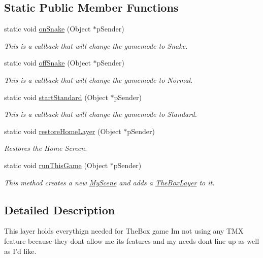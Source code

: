 \subsection*{\-Static \-Public \-Member \-Functions}
\begin{DoxyCompactItemize}
\item 
static void \hyperlink{class_the_box_layer_a91e48a9efb07ed70fac3e1880934cf37}{on\-Snake} (\-Object $\ast$p\-Sender)
\begin{DoxyCompactList}\small\item\em \-This is a callback that will change the gamemode to \-Snake. \end{DoxyCompactList}\item 
static void \hyperlink{class_the_box_layer_ae03788f405b053b85e230804d7a88904}{off\-Snake} (\-Object $\ast$p\-Sender)
\begin{DoxyCompactList}\small\item\em \-This is a callback that will change the gamemode to \-Normal. \end{DoxyCompactList}\item 
static void \hyperlink{class_the_box_layer_a3e32611fa82942d00d5e561bc59251e9}{start\-Standard} (\-Object $\ast$p\-Sender)
\begin{DoxyCompactList}\small\item\em \-This is a callback that will change the gamemode to \-Standard. \end{DoxyCompactList}\item 
static void \hyperlink{class_the_box_layer_af670f77242c15a7de84d6658cddb7056}{restore\-Home\-Layer} (\-Object $\ast$p\-Sender)
\begin{DoxyCompactList}\small\item\em \-Restores the \-Home \-Screen. \end{DoxyCompactList}\item 
static void \hyperlink{class_the_box_layer_a3acdbe7193e4da946ba01f80daa951ad}{run\-This\-Game} (\-Object $\ast$p\-Sender)
\begin{DoxyCompactList}\small\item\em \-This method creates a new \hyperlink{class_my_scene}{\-My\-Scene} and adds a \hyperlink{class_the_box_layer}{\-The\-Box\-Layer} to it. \end{DoxyCompactList}\end{DoxyCompactItemize}


\subsection{\-Detailed \-Description}
\-This layer holds everythign needed for \-The\-Box game \-Im not using any \-T\-M\-X feature because they dont allow me its features and my needs dont line up as well as \-I'd like. 

